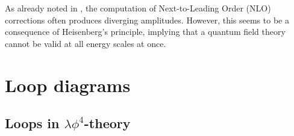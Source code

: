 
As already noted in , the computation of Next-to-Leading Order (NLO) corrections often produces diverging amplitudes. However, this seems to be a consequence of Heisenberg's principle, implying that a quantum field theory cannot be valid at all energy scales at once.

\section{Loop diagrams}

\subsection{Loops in \texorpdfstring{$ \lambda \phi^4 $}{λφ4}-theory}

